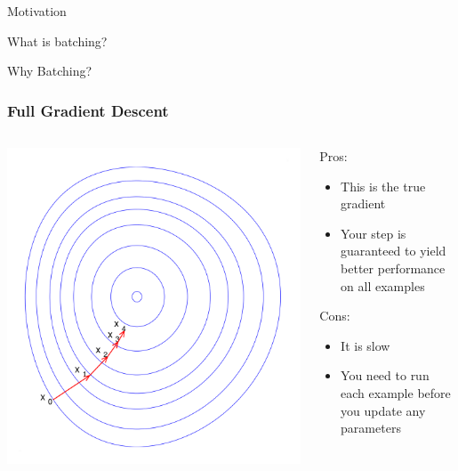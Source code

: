 \documentclass{beamer}
\begin{document}
\begin{section}{Motivation}
\begin{subsection}{What is batching?}
    \end{subsection} %

    \begin{subsection}{Why Batching?}

        \begin{frame}
            \frametitle{Full Gradient Descent}

            \begin{columns}
                \begin{column}{0.5\textwidth}
                    \includegraphics[width=\textwidth]{images/full-gradient-descent.png}
                \end{column}
                \begin{column}{0.5\textwidth}
                    Pros:
                    \begin{itemize}
                        \item This is the true gradient
                        \item Your step is guaranteed to yield better performance on all examples
                    \end{itemize}
                    Cons:
                    \begin{itemize}
                        \item It is slow
                        \item You need to run each example before you update any parameters
                    \end{itemize}
                \end{column}
            \end{columns}


\end{frame}
\end{subsection}
\end{section}
\end{document}
